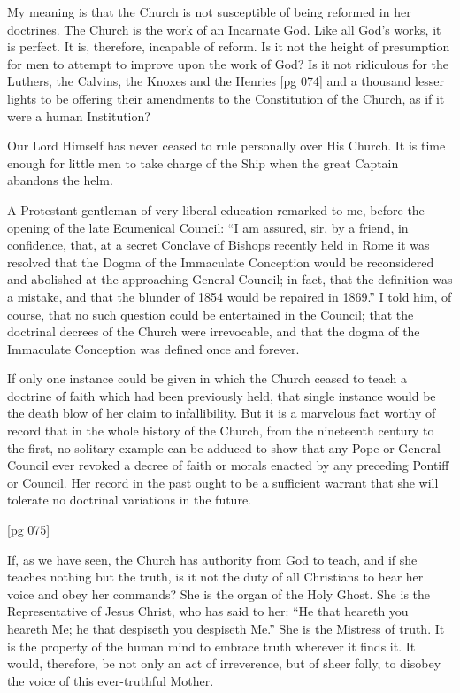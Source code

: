 My meaning is that the Church is not susceptible
of being reformed in her doctrines. The
Church is the work of an Incarnate God. Like all
God's works, it is perfect. It is, therefore, incapable
of reform. Is it not the height of presumption
for men to attempt to improve upon the
work of God? Is it not ridiculous for the Luthers,
the Calvins, the Knoxes and the Henries
[pg 074]
and a thousand lesser lights to be offering their
amendments to the Constitution of the Church, as
if it were a human Institution?

Our Lord Himself has never ceased to rule personally
over His Church. It is time enough for
little men to take charge of the Ship when the
great Captain abandons the helm.

A Protestant gentleman of very liberal education
remarked to me, before the opening of the
late Ecumenical Council: “I am assured, sir,
by a friend, in confidence, that, at a secret Conclave
of Bishops recently held in Rome it was
resolved that the Dogma of the Immaculate Conception
would be reconsidered and abolished at
the approaching General Council; in fact, that
the definition was a mistake, and that the blunder
of 1854 would be repaired in 1869.” I told him,
of course, that no such question could be entertained
in the Council; that the doctrinal decrees
of the Church were irrevocable, and that the
dogma of the Immaculate Conception was defined
once and forever.

If only one instance could be given in which
the Church ceased to teach a doctrine of faith
which had been previously held, that single instance
would be the death blow of her claim to infallibility.
But it is a marvelous fact worthy
of record that in the whole history of the Church,
from the nineteenth century to the first, no solitary
example can be adduced to show that any
Pope or General Council ever revoked a decree
of faith or morals enacted by any preceding Pontiff
or Council. Her record in the past ought to
be a sufficient warrant that she will tolerate no
doctrinal variations in the future.

[pg 075]

If, as we have seen, the Church has authority
from God to teach, and if she teaches nothing
but the truth, is it not the duty of all Christians
to hear her voice and obey her commands? She
is the organ of the Holy Ghost. She is the Representative
of Jesus Christ, who has said to her:
“He that heareth you heareth Me; he that despiseth
you despiseth Me.” She is the Mistress
of truth. It is the property of the human mind
to embrace truth wherever it finds it. It would,
therefore, be not only an act of irreverence, but
of sheer folly, to disobey the voice of this ever-truthful
Mother.

